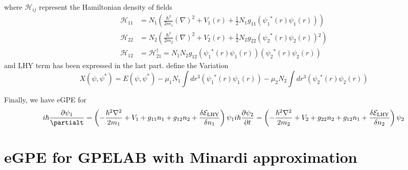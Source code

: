 where $\mathcal{H}_{ij}$ represent the Hamiltonian density of fields
\begin{equation}
\begin{split}
\mathcal{H}_{11}&=N_1\left(\frac{\hbar ^2}{2m_1}(\nabla )^2+V_1(r)+\frac{1}{2}N_1g_{11}\left(\psi _1{}^*(r)\psi _1(r)\right)\right)\\
\mathcal{H}_{22}&=N_2\left(\frac{\hbar ^2}{2m_2}(\nabla )^2+V_2(r)+\frac{1}{2}N_2g_{22}\left(\psi _2{}^*(r)\psi _2(r)\right){}^2\right)\\
\mathcal{H}_{12}&=\mathcal{H}_{21}^{\dagger }=N_1N_2g_{12}\left(\psi _1{}^*(r)\psi _1(r)\right)\left(\psi _2{}^*(r)\psi _2(r)\right)
\end{split}
\end{equation}
and LHY term has been expressed in the last part.
define the Variation
\begin{equation}
X\left(\psi ,\psi ^*\right)=E\left(\psi ,\psi ^*\right)-\mu _1 N_1\int dr^3\left(\psi _1{}^*(r)\psi _1(r)\right)-\mu _2 N_2\int dr^3\left(\psi
_2{}^*(r)\psi _2(r)\right)
\end{equation}

Finally, we have eGPE for 
\begin{equation}
i \hbar \frac{\partial\psi_1}{\partialt}=\left(-\frac{\hbar^2\nabla^2}{2m_1}+V_1+g_{11}n_1+g_{12}n_2+\frac{\delta  \mathcal{E}_{\text{LHY}}}{\delta n_1}\right)\psi _1\\
i \hbar \frac{\partial \psi _2}{\partial t}=\left(-\frac{\hbar ^2\nabla ^2}{2m_2}+V_2+g_{22}n_2+g_{12}n_1+\frac{\delta  \mathcal{E}_{\text{LHY}}}{\delta n_2}\right)\psi _2
\end{equation}

\section*{eGPE for GPELAB with Minardi approximation}

